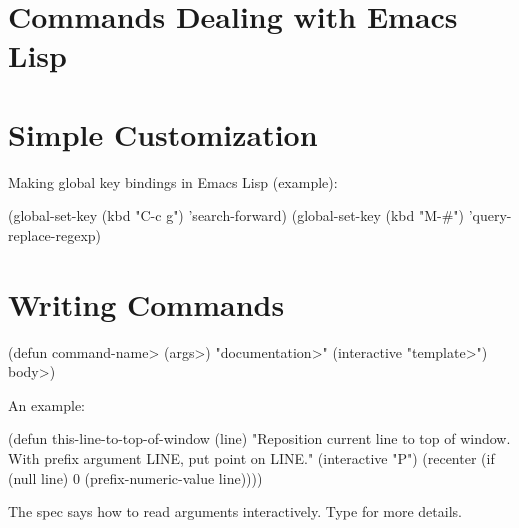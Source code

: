 
\section{Commands Dealing with Emacs Lisp}


\section{Simple Customization}



Making global key bindings in Emacs Lisp (example):

\beginexample%
(global-set-key (kbd "C-c g") 'search-forward)
(global-set-key (kbd "M-\#") 'query-replace-regexp)
\endexample

\section{Writing Commands}

\beginexample%
(defun \<command-name> (\<args>)
  "\<documentation>" (interactive "\<template>")
  \<body>)
\endexample

An example:

\beginexample%
(defun this-line-to-top-of-window (line)
  "Reposition current line to top of window.
With prefix argument LINE, put point on LINE."
  (interactive "P")
  (recenter (if (null line)
                0
              (prefix-numeric-value line))))
\endexample

The  spec says how to read arguments interactively.
Type  for more details.

\copyrightnotice

\bye


